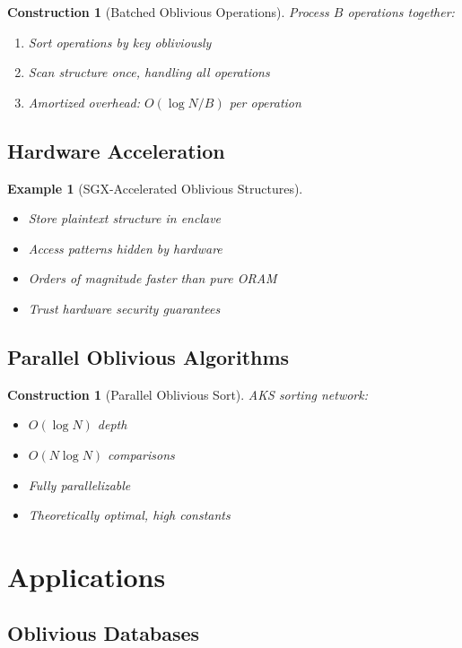 \documentclass[11pt,final,hidelinks]{article}
\newtheorem{example}[theorem]{Example}
\newtheorem{construction}[theorem]{Construction}
\begin{document}
\begin{construction}[Batched Oblivious Operations]
Process $B$ operations together:
\begin{enumerate}
    \item Sort operations by key obliviously
    \item Scan structure once, handling all operations
    \item Amortized overhead: $O(\log N / B)$ per operation
\end{enumerate}
\end{construction}

\subsection{Hardware Acceleration}

\begin{example}[SGX-Accelerated Oblivious Structures]
\begin{itemize}
    \item Store plaintext structure in enclave
    \item Access patterns hidden by hardware
    \item Orders of magnitude faster than pure ORAM
    \item Trust hardware security guarantees
\end{itemize}
\end{example}

\subsection{Parallel Oblivious Algorithms}

\begin{construction}[Parallel Oblivious Sort]
AKS sorting network:
\begin{itemize}
    \item $O(\log N)$ depth
    \item $O(N \log N)$ comparisons
    \item Fully parallelizable
    \item Theoretically optimal, high constants
\end{itemize}
\end{construction}

\section{Applications}

\subsection{Oblivious Databases}
\end{document}
